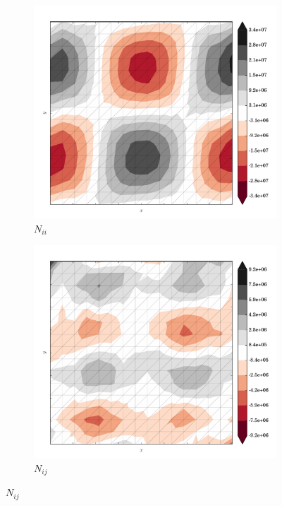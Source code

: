 \begin{figure}
  \begin{subfigure}[b]{0.3\linewidth}
    \includegraphics[width=\linewidth]{images/stress_balance/FS/N_ii.pdf}
  \caption{$N_{ii}$}
  \label{fs_N_ii}
  \end{subfigure}
  \begin{subfigure}[b]{0.3\linewidth}
    \includegraphics[width=\linewidth]{images/stress_balance/FS/N_ij.pdf}
  \caption{$N_{ij}$}
  \label{fs_N_ij}
  \end{subfigure}

\end{figure}
